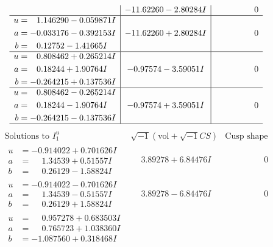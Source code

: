 \documentclass[1p]{elsarticle_modified}
\theoremstyle{definition}
\newcommand{\I}{\sqrt{-1}}
\begin{document}
$$\begin{array}{c|c|c}
 & -11.62260 - 2.80284 I & \phantom{-0.000000 } 0 \\ \hline\begin{aligned}
u &= \phantom{-}1.146290 - 0.059871 I \\
a &= -0.033176 - 0.392153 I \\
b &= \phantom{-}0.12752 - 1.41665 I\end{aligned}
 & -11.62260 + 2.80284 I & \phantom{-0.000000 } 0 \\ \hline\begin{aligned}
u &= \phantom{-}0.808462 + 0.265214 I \\
a &= \phantom{-}0.18244 + 1.90764 I \\
b &= -0.264215 + 0.137536 I\end{aligned}
 & -0.97574 - 3.59051 I & \phantom{-0.000000 } 0 \\ \hline\begin{aligned}
u &= \phantom{-}0.808462 - 0.265214 I \\
a &= \phantom{-}0.18244 - 1.90764 I \\
b &= -0.264215 - 0.137536 I\end{aligned}
 & -0.97574 + 3.59051 I & \phantom{-0.000000 } 0\\
 \hline 
 \end{array}$$\newpage$$\begin{array}{c|c|c}  
\text{Solutions to }I^u_{1}& \I (\text{vol} + \sqrt{-1}CS) & \text{Cusp shape}\\
 \hline 
\begin{aligned}
u &= -0.914022 + 0.701626 I \\
a &= \phantom{-}1.34539 + 0.51557 I \\
b &= \phantom{-}0.26129 - 1.58824 I\end{aligned}
 & \phantom{-}3.89278 + 6.84476 I & \phantom{-0.000000 } 0 \\ \hline\begin{aligned}
u &= -0.914022 - 0.701626 I \\
a &= \phantom{-}1.34539 - 0.51557 I \\
b &= \phantom{-}0.26129 + 1.58824 I\end{aligned}
 & \phantom{-}3.89278 - 6.84476 I & \phantom{-0.000000 } 0 \\ \hline\begin{aligned}
u &= \phantom{-}0.957278 + 0.683503 I \\
a &= \phantom{-}0.765723 + 1.038360 I \\
b &= -1.087560 + 0.318468 I\end{aligned}

\end{array}$$
\end{document}

